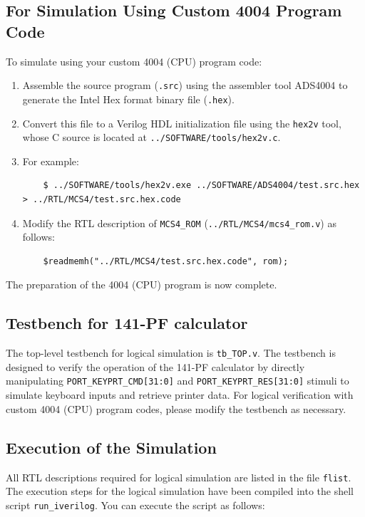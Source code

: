\subsection{For Simulation Using Custom 4004 Program Code}
To simulate using your custom 4004 (CPU) program code:
\begin{enumerate}
    \item Assemble the source program (\texttt{.src}) using the assembler tool ADS4004 to generate the Intel Hex format binary file (\texttt{.hex}).
    \item Convert this file to a Verilog HDL initialization file using the \texttt{hex2v} tool, whose C source is located at \texttt{../SOFTWARE/tools/hex2v.c}.
    \item For example:
    \begin{verbatim}
    $ ../SOFTWARE/tools/hex2v.exe ../SOFTWARE/ADS4004/test.src.hex > ../RTL/MCS4/test.src.hex.code
    \end{verbatim}
    \item Modify the RTL description of \texttt{MCS4\_ROM} (\texttt{../RTL/MCS4/mcs4\_rom.v}) as follows:
    \begin{verbatim}
    $readmemh("../RTL/MCS4/test.src.hex.code", rom);
    \end{verbatim}
\end{enumerate}

The preparation of the 4004 (CPU) program is now complete.

\subsection{Testbench for 141-PF calculator}
The top-level testbench for logical simulation is \texttt{tb\_TOP.v}. The testbench is designed to verify the operation of the 141-PF calculator by directly manipulating \texttt{PORT\_KEYPRT\_CMD[31:0]} and \texttt{PORT\_KEYPRT\_RES[31:0]} stimuli to simulate keyboard inputs and retrieve printer data. For logical verification with custom 4004 (CPU) program codes, please modify the testbench as necessary.

\subsection{Execution of the Simulation}
All RTL descriptions required for logical simulation are listed in the file \texttt{flist}. The execution steps for the logical simulation have been compiled into the shell script \texttt{run\_iverilog}. You can execute the script as follows:

